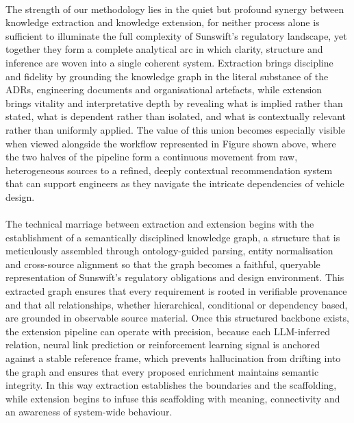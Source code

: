         \paragraph{}
        The strength of our methodology lies in the quiet but profound synergy between knowledge extraction and knowledge extension, for neither process alone is sufficient to illuminate the full complexity of Sunswift’s regulatory landscape, yet together they form a complete analytical arc in which clarity, structure and inference are woven into a single coherent system. Extraction brings discipline and fidelity by grounding the knowledge graph in the literal substance of the ADRs, engineering documents and organisational artefacts, while extension brings vitality and interpretative depth by revealing what is implied rather than stated, what is dependent rather than isolated, and what is contextually relevant rather than uniformly applied. The value of this union becomes especially visible when viewed alongside the workflow represented in Figure shown above, where the two halves of the pipeline form a continuous movement from raw, heterogeneous sources to a refined, deeply contextual recommendation system that can support engineers as they navigate the intricate dependencies of vehicle design.

        \paragraph{}
        The technical marriage between extraction and extension begins with the establishment of a semantically disciplined knowledge graph, a structure that is meticulously assembled through ontology-guided parsing, entity normalisation and cross-source alignment so that the graph becomes a faithful, queryable representation of Sunswift’s regulatory obligations and design environment. This extracted graph ensures that every requirement is rooted in verifiable provenance and that all relationships, whether hierarchical, conditional or dependency based, are grounded in observable source material. Once this structured backbone exists, the extension pipeline can operate with precision, because each LLM-inferred relation, neural link prediction or reinforcement learning signal is anchored against a stable reference frame, which prevents hallucination from drifting into the graph and ensures that every proposed enrichment maintains semantic integrity. In this way extraction establishes the boundaries and the scaffolding, while extension begins to infuse this scaffolding with meaning, connectivity and an awareness of system-wide behaviour.

